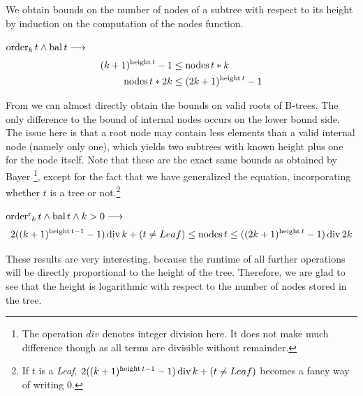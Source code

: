 
We obtain bounds
on the number of nodes of a subtree with respect to its height
by induction on the computation of the nodes function.

\begin{lemma}
    \label{lem:bound_internal_node}
    $\operatorname{order}_k t \wedge \operatorname{bal} t \longrightarrow$
    \begin{align}
        (k+1)^{\operatorname{height} t} - 1 &\le \operatorname{nodes} t * k \\
        \operatorname{nodes} t * 2k &\le (2k+1)^{\operatorname{height} t} - 1
    \end{align}
\end{lemma}

From  we can almost directly obtain
the bounds on valid roots of B-trees.
The only difference to the bound of internal nodes occurs on the lower bound side.
The issue here is that a root node may contain less elements than
a valid internal node (namely only one), which yields two subtrees with known height
plus one for the node itself.
Note that these are the exact same bounds as obtained by Bayer \parencite{DBLP:journals/acta/BayerM72}\footnote{
    The operation $div$ denotes integer division here.
    It does not make much difference though as all terms are divisible
    without remainder.
},
except for the fact that we have generalized the equation,
incorporating whether $t$ is a tree or not.\footnote{
    If $t$ is a \textit{Leaf},
    $2((k+1)^{\operatorname{height} t - 1} - 1) \operatorname{div} k + (t \neq Leaf)$ becomes a fancy way of writing $0$.
}

\begin{theorem}
    \label{thm:bound_btree}
    $\operatorname{order^r}_k t \wedge \operatorname{bal} t \wedge k > 0 \longrightarrow$
    \begin{equation}
        2((k+1)^{\operatorname{height} t - 1} - 1) \operatorname{div} k + (t \neq Leaf) \le \operatorname{nodes} t \le ((2k+1)^{\operatorname{height} t} - 1) \operatorname{div} 2k
    \end{equation}
\end{theorem}

These results are very interesting, because
the runtime of all further operations will be
directly proportional to the height of the tree.
Therefore, we are glad to see that the height is logarithmic
with respect to the number of nodes stored in the tree.


